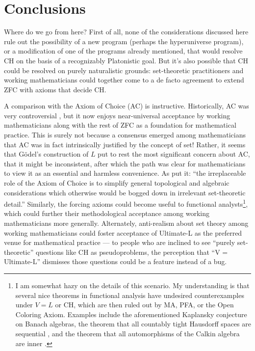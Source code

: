 \documentclass[letterpaper,12pt]{article}
\begin{document}
\section{Conclusions}
Where do we go from here? First of all, none of the considerations discussed here rule out the possibility of a new program (perhaps the hyperuniverse program), or a modification of one of the programs already mentioned, that would resolve CH on the basis of a recognizably Platonistic goal. But it's also possible that CH could be resolved on purely naturalistic grounds: set-theoretic practitioners and working mathematicians could together come to a de facto agreement to extend ZFC with axioms that decide CH.

A comparison with the Axiom of Choice (AC) is instructive. Historically, AC was very controversial \citep{sep-axiom-choice}, but it now enjoys near-universal acceptance by working mathematicians along with the rest of ZFC as a foundation for mathematical practice. This is surely not because a consensus emerged among mathematicians that AC was in fact intrinsically justified by the concept of set! Rather, it seems that G\"odel's construction of $L$ put to rest the most significant concern about AC, that it might be inconsistent, after which the path was clear for mathematicians to view it as an essential and harmless convenience. As \cite{hrbacek1999introduction} put it: ``the irreplaceable role of the Axiom of Choice is to simplify general topological and algebraic considerations which otherwise would be bogged down in irrelevant set-theoretic detail.'' Similarly, the forcing axioms could become useful to functional analysts\footnote{I am somewhat hazy on the details of this scenario. My understanding is that several nice theorems in functional analysis have undesired counterexamples under $V = L$ or CH, which are then ruled out by MA, PFA, or the Open Coloring Axiom. Examples include the aforementioned Kaplansky conjecture on Banach algebras, the theorem that all countably tight Hausdorff spaces are sequential \citep{balogh1988countable}, and the theorem that all automorphisms of the Calkin algebra are inner \citep{farah2011all}.}, which could further their methodological acceptance among working mathematicians more generally. Alternately, anti-realism about set theory among working mathematicians could foster acceptance of Ultimate-L as the preferred venue for mathematical practice --- to people who are inclined to see ``purely set-theoretic'' questions like CH as pseudoproblems, the perception that ``V = Ultimate-L'' dismisses those questions could be a feature instead of a bug.
\end{document}
